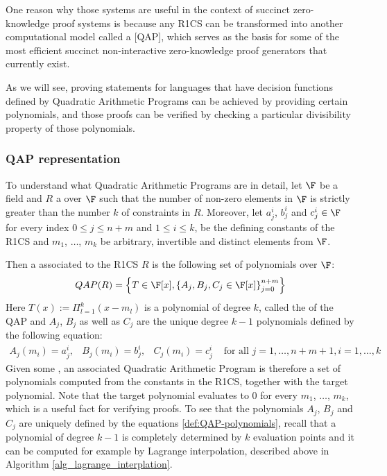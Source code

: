 One reason why those systems are useful in the context of succinct zero-knowledge proof systems is because any R1CS can be transformed into another computational model called a  [QAP], which serves as the basis for some of the most efficient succinct non-interactive zero-knowledge proof generators that currently exist. 

As we will see, proving statements for languages that have decision functions defined by Quadratic Arithmetic Programs can be achieved by providing certain polynomials, and those proofs can be verified by checking a particular divisibility property of those polynomials.
 
\subsubsection{QAP representation} To understand what Quadratic Arithmetic Programs are in detail, let $\F$ be a field and $R$ a  over $\F$ such that the number of non-zero elements in $\F$ is strictly greater than the number $k$ of constraints in $R$. Moreover, let $a_j^i$, $b_j^i$ and $c_j^i\in\F$ for every index $0\leq j \leq n+m$ and $1\leq i \leq k$, be the defining constants of the R1CS and $m_1$, $\ldots$, $m_k$ be arbitrary, invertible and distinct elements from $\F$.
  
Then a  associated to the R1CS $R$ is the following set of polynomials over $\F$:
\begin{equation}
\label{def:QAP-target-poly}
QAP(R) = \left\{T\in \F[x],\left\{A_j,B_j,C_j\in \F[x]\right\}_{j=0}^{n+m}\right\}
\end{equation}
Here $T(x) := \Pi_{l=1}^k (x- m_l)$ is a polynomial of degree $k$, called the  of the QAP and $A_j$, $B_j$ as well as $C_j$ are the unique degree $k-1$ polynomials defined by the following equation:
\begin{equation}
\label{def:QAP-polynomials}
\begin{array}{lllr}
A_j(m_i)=a_j^i, & B_j(m_i)=b_j^i, & C_j(m_i)=c_j^i & \text{ for all } j= 1, \ldots , n+m+1, i=1,\ldots,k 
\end{array}
\end{equation}
Given some , an associated Quadratic Arithmetic Program is therefore a set of polynomials computed from the constants in the R1CS, together with the target polynomial. Note that the target polynomial evaluates to $0$ for every $m_1$, $\ldots$, $m_k$, which is a useful fact for verifying proofs. To see that the polynomials $A_j$, $B_j$ and $C_j$ are uniquely defined by the equations \ref{def:QAP-polynomials}, recall that a polynomial of degree $k-1$ is completely determined by $k$ evaluation points and it can be computed for example by Lagrange interpolation, described above in Algorithm \ref{alg_lagrange_interplation}.

